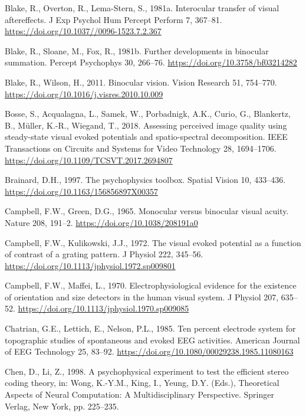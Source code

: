 \documentclass[
  12pt,
]{article}
\newlength{\cslhangindent}
\newenvironment{CSLReferences}[2] %
 {\begin{list}{}{%
  \setlength{\itemindent}{0pt}
  \setlength{\leftmargin}{0pt}
  \setlength{\parsep}{0pt}
  \ifodd #1
   \setlength{\leftmargin}{\cslhangindent}
   \setlength{\itemindent}{-1\cslhangindent}
  \fi
  \setlength{\itemsep}{#2\baselineskip}}}
 {\end{list}}
\begin{document}
\begin{CSLReferences}{1}{0}
Blake, R., Overton, R., Lema-Stern, S., 1981a. Interocular transfer of
visual aftereffects. J Exp Psychol Hum Percept Perform 7, 367--81.
\url{https://doi.org/10.1037//0096-1523.7.2.367}

Blake, R., Sloane, M., Fox, R., 1981b. Further developments in binocular
summation. Percept Psychophys 30, 266--76.
\url{https://doi.org/10.3758/bf03214282}

Blake, R., Wilson, H., 2011. Binocular vision. Vision Research 51,
754--770. \url{https://doi.org/10.1016/j.visres.2010.10.009}

Bosse, S., Acqualagna, L., Samek, W., Porbadnigk, A.K., Curio, G.,
Blankertz, B., Müller, K.-R., Wiegand, T., 2018. Assessing perceived
image quality using steady-state visual evoked potentials and
spatio-spectral decomposition. IEEE Transactions on Circuits and Systems
for Video Technology 28, 1694--1706.
\url{https://doi.org/10.1109/TCSVT.2017.2694807}

Brainard, D.H., 1997. The psychophysics toolbox. Spatial Vision 10,
433--436. \url{https://doi.org/10.1163/156856897X00357}

Campbell, F.W., Green, D.G., 1965. Monocular versus binocular visual
acuity. Nature 208, 191--2. \url{https://doi.org/10.1038/208191a0}

Campbell, F.W., Kulikowski, J.J., 1972. The visual evoked potential as a
function of contrast of a grating pattern. J Physiol 222, 345--56.
\url{https://doi.org/10.1113/jphysiol.1972.sp009801}

Campbell, F.W., Maffei, L., 1970. Electrophysiological evidence for the
existence of orientation and size detectors in the human visual system.
J Physiol 207, 635--52.
\url{https://doi.org/10.1113/jphysiol.1970.sp009085}

Chatrian, G.E., Lettich, E., Nelson, P.L., 1985. Ten percent electrode
system for topographic studies of spontaneous and evoked EEG activities.
American Journal of EEG Technology 25, 83--92.
\url{https://doi.org/10.1080/00029238.1985.11080163}

Chen, D., Li, Z., 1998. A psychophysical experiment to test the
efficient stereo coding theory, in: Wong, K.-Y.M., King, I., Yeung, D.Y.
(Eds.), Theoretical Aspects of Neural Computation: A Multidisciplinary
Perspective. Springer Verlag, New York, pp. 225--235.


\end{CSLReferences}
\end{document}
